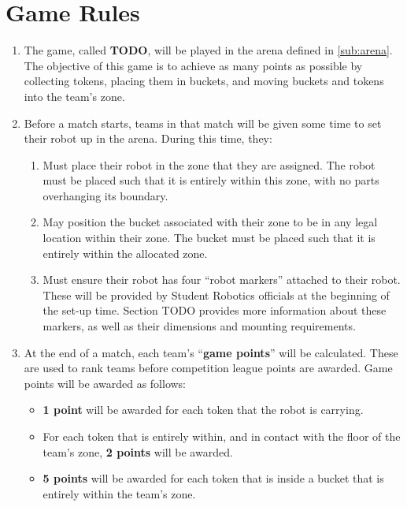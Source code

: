 \section {Game Rules}
\label{game-rules}

\begin{enumerate}
\item The game, called \textbf{TODO}, will be played in the arena defined in \autoref{sub:arena}.  The objective of this game is to achieve as many points as possible by collecting tokens, placing them in buckets, and moving buckets and tokens into the team's zone.

\item Before a match starts, teams in that match will be given some time to set their robot up in the arena.  During this time, they:
\begin{enumerate}
  \item Must place their robot in the zone that they are assigned.  The robot must be placed such that it is entirely within this zone, with no parts overhanging its boundary.

  \item May position the bucket associated with their zone to be in any legal location within their zone.  The bucket must be placed such that it is entirely within the allocated zone.

  \item Must ensure their robot has four ``robot markers'' attached to their robot.  These will be provided by Student Robotics officials at the beginning of the set-up time.  Section TODO provides more information about these markers, as well as their dimensions and mounting requirements.
\end{enumerate}

\item At the end of a match, each team's ``\textbf{game points}'' will be calculated.
 These are used to rank teams before competition league points are awarded.  Game points will be awarded as follows:
\begin{itemize}
  \item \textbf{1 point} will be awarded for each token that the robot is carrying.
  \item For each token that is entirely within, and in contact with the floor of the team's zone, \textbf{2 points} will be awarded.
  \item \textbf{5 points} will be awarded for each token that is inside a bucket that is entirely within the team's zone.


\end{itemize}
\end{enumerate}
